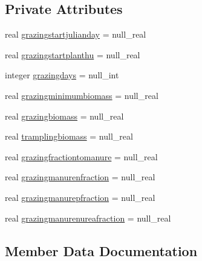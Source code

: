 \subsection*{Private Attributes}
\begin{DoxyCompactItemize}
\item 
real \mbox{\hyperlink{structmodulevegetation_1_1t__grazingdatabase_a77fc9b4f345d4101777b04c62b8b8afd}{grazingstartjulianday}} = null\+\_\+real
\item 
real \mbox{\hyperlink{structmodulevegetation_1_1t__grazingdatabase_ad676a0b355f20b50d0d95aa6198a0f5e}{grazingstartplanthu}} = null\+\_\+real
\item 
integer \mbox{\hyperlink{structmodulevegetation_1_1t__grazingdatabase_ad95e89e59a70c30033d8428e9879f272}{grazingdays}} = null\+\_\+int
\item 
real \mbox{\hyperlink{structmodulevegetation_1_1t__grazingdatabase_a5f6a1d82f9d5e7381d5421f18bb77807}{grazingminimumbiomass}} = null\+\_\+real
\item 
real \mbox{\hyperlink{structmodulevegetation_1_1t__grazingdatabase_a8c9aca2093a4179b8f35614cdb0f8402}{grazingbiomass}} = null\+\_\+real
\item 
real \mbox{\hyperlink{structmodulevegetation_1_1t__grazingdatabase_a68700ae52c5ce77b70bdb7c2d322034f}{tramplingbiomass}} = null\+\_\+real
\item 
real \mbox{\hyperlink{structmodulevegetation_1_1t__grazingdatabase_a5733e46cff9baa5a899ef46520e063b7}{grazingfractiontomanure}} = null\+\_\+real
\item 
real \mbox{\hyperlink{structmodulevegetation_1_1t__grazingdatabase_a5ac8f25fcaf0cf81e7e8a4b9aa76b241}{grazingmanurenfraction}} = null\+\_\+real
\item 
real \mbox{\hyperlink{structmodulevegetation_1_1t__grazingdatabase_a787e64dcb277954381a8c780d73010a8}{grazingmanurepfraction}} = null\+\_\+real
\item 
real \mbox{\hyperlink{structmodulevegetation_1_1t__grazingdatabase_a807e86a194866f7bb6b8e7b32ed5ff89}{grazingmanurenureafraction}} = null\+\_\+real
\end{DoxyCompactItemize}


\subsection{Member Data Documentation}
\mbox{\label{structmodulevegetation_1_1t__grazingdatabase_a8c9aca2093a4179b8f35614cdb0f8402}} 
